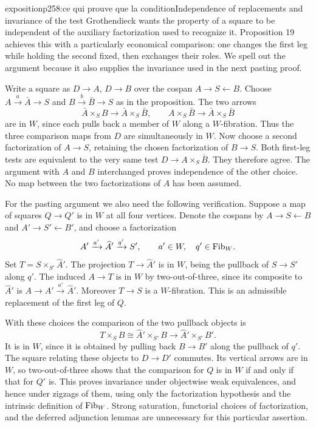 \begin{dcomment}{exposition}{p258:ce qui prouve que la condition}{Independence of replacements and invariance of the test}
Grothendieck wants the property of a square to be independent of the auxiliary factorization used to recognize it. Proposition 19 achieves this with a particularly economical comparison: one changes the first leg while holding the second fixed, then exchanges their roles. We spell out the argument because it also supplies the invariance used in the next pasting proof.

Write a square as $D\to A$, $D\to B$ over the cospan $A\to S\leftarrow B$. Choose $A\xrightarrow{a}\bar A\to S$ and $B\xrightarrow{b}\bar B\to S$ as in the proposition. The two arrows
\[
 \bar A\times_S B\longrightarrow\bar A\times_S\bar B,
 \qquad
 A\times_S\bar B\longrightarrow\bar A\times_S\bar B
\]
are in $W$, since each pulls back a member of $W$ along a $W$-fibration. Thus the three comparison maps from $D$ are simultaneously in $W$. Now choose a second factorization of $A\to S$, retaining the chosen factorization of $B\to S$. Both first-leg tests are equivalent to the very same test $D\to A\times_S\bar B$. They therefore agree. The argument with $A$ and $B$ interchanged proves independence of the other choice. No map between the two factorizations of $A$ has been assumed.

For the pasting argument we also need the following verification. Suppose a map of squares $Q\to Q'$ is in $W$ at all four vertices. Denote the cospans by $A\to S\leftarrow B$ and $A'\to S'\leftarrow B'$, and choose a factorization
\[
 A'\xrightarrow{a'}\widehat A'\xrightarrow{q'}S',
 \qquad a'\in W,\quad q'\in\mathrm{Fib}_W.
\]
Set $T=S\times_{S'}\widehat A'$. The projection $T\to\widehat A'$ is in $W$, being the pullback of $S\to S'$ along $q'$. The induced $A\to T$ is in $W$ by two-out-of-three, since its composite to $\widehat A'$ is $A\to A'\xrightarrow{a'}\widehat A'$. Moreover $T\to S$ is a $W$-fibration. This is an admissible replacement of the first leg of $Q$.

With these choices the comparison of the two pullback objects is
\[
 T\times_S B\cong\widehat A'\times_{S'}B
 \longrightarrow\widehat A'\times_{S'}B'.
\]
It is in $W$, since it is obtained by pulling back $B\to B'$ along the pullback of $q'$. The square relating these objects to $D\to D'$ commutes. Its vertical arrows are in $W$, so two-out-of-three shows that the comparison for $Q$ is in $W$ if and only if that for $Q'$ is. This proves invariance under objectwise weak equivalences, and hence under zigzags of them, using only the factorization hypothesis and the intrinsic definition of $\mathrm{Fib}_W$. Strong saturation, functorial choices of factorization, and the deferred adjunction lemmas are unnecessary for this particular assertion.
\end{dcomment}


